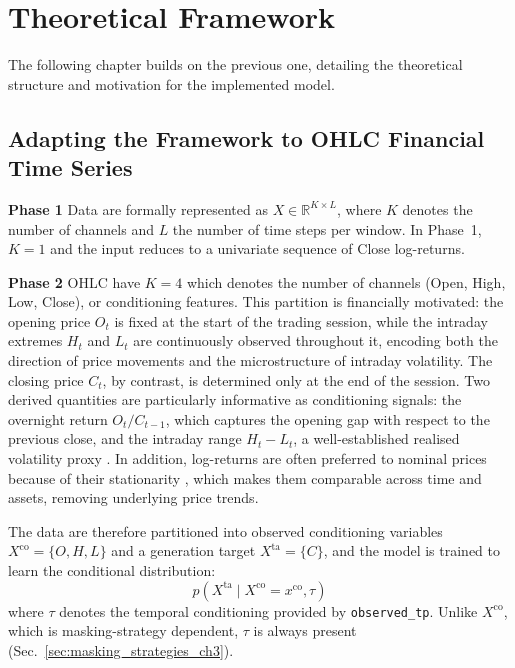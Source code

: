 \chapter{Theoretical Framework}
\label{ch:theoretical_framework}
The following chapter builds on the previous one, detailing the theoretical structure and motivation for the implemented model.

\section{Adapting the Framework to OHLC Financial Time Series}
\label{sec:ohlc_theoretical}

\textbf{Phase 1} \quad Data are formally represented as \(X \in \mathbb{R}^{K \times L}\), where \(K\) denotes the number of channels and \(L\) the number of time steps per window. In Phase~1, \(K = 1\) and the input reduces to a univariate sequence of Close log-returns.

\textbf{Phase 2} \quad OHLC have \(K = 4\) which denotes the number of channels (Open, High, Low, Close), or conditioning features. This partition is 
financially motivated: the opening price \(O_t\) is fixed at the start of 
the trading session, while the intraday extremes \(H_t\) and \(L_t\) are 
continuously observed throughout it, encoding both the direction of price 
movements and the microstructure of intraday volatility. The closing price 
\(C_t\), by contrast, is determined only at the end of the session. Two 
derived quantities are particularly informative as conditioning signals: the 
overnight return \(O_t / C_{t-1}\), which captures the opening gap with 
respect to the previous close, and the intraday range \(H_t - L_t\), a 
well-established realised volatility proxy \cite{parkinson1980extreme}. In addition, log-returns are often preferred to nominal prices because of their stationarity \cite{cont2001empirical}, which makes them comparable across time and assets, removing underlying price trends.

The data are therefore partitioned into observed conditioning variables
$X^{\text{co}} = \{O, H, L\}$ and a generation target $X^{\text{ta}} = \{C\}$,
and the model is trained to learn the conditional distribution:
\[
    p\!\left(X^{\text{ta}} \mid X^{\text{co}} = x^{\text{co}}, \tau\right)
\]
where \(\tau\) denotes the temporal conditioning provided by \texttt{observed\_tp}. Unlike \(X^{\text{co}}\), which is masking-strategy dependent, \(\tau\) is always present (Sec.\ \ref{sec:masking_strategies_ch3}).

